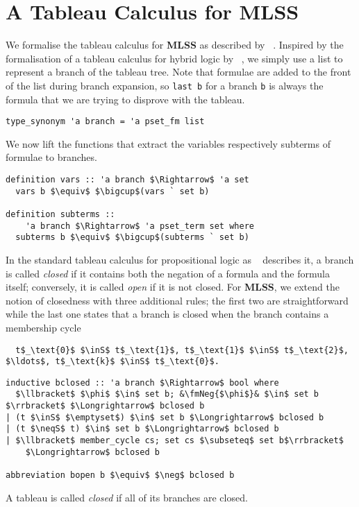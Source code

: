 \documentclass[sigplan,10pt,anonymous,review]{acmart}
\newcommand{\MLSS}{\textbf{MLSS}}
\newcommand{\inS}{\in_\text{s}}
\newcommand{\neqS}{\neq_\text{s}}
\newcommand{\fmNegSymbol}{\boldsymbol{\neg}}
\newcommand{\fmNeg}[1]{$\fmNegSymbol$ #1}
\begin{document}
\section{A Tableau Calculus for MLSS}
We formalise the tableau calculus for \MLSS{} as described by \citeauthor{new_fast_tableau}~\cite{new_fast_tableau}.
Inspired by the formalisation of a tableau calculus for hybrid logic by \citeauthor{hybrid_logic_afp}~\cite{hybrid_logic_afp}, we simply use a list to represent a branch of the tableau tree.
Note that formulae are added to the front of the list during branch expansion, so \lstinline!last b! for a branch \lstinline!b! is always the formula that we are trying to disprove with the tableau. 
\begin{lstlisting}
type_synonym 'a branch = 'a pset_fm list
\end{lstlisting}
We now lift the functions that extract the variables respectively subterms of formulae to branches.
\begin{lstlisting}
definition vars :: 'a branch $\Rightarrow$ 'a set 
  vars b $\equiv$ $\bigcup$(vars ` set b)

definition subterms ::
    'a branch $\Rightarrow$ 'a pset_term set where
  subterms b $\equiv$ $\bigcup$(subterms ` set b)
\end{lstlisting}
In the standard tableau calculus for propositional logic as \citeauthor{tableau}~\cite{tableau} describes it, a branch is called \textit{closed} if it contains both the negation of a formula and the formula itself;
conversely, it is called \textit{open} if it is not closed.
For \MLSS{}, we extend the notion of closedness with three additional rules; the first two are straightforward while the last one states that a branch is closed when the branch contains a membership cycle
\begin{lstlisting}
  t$_\text{0}$ $\inS$ t$_\text{1}$, t$_\text{1}$ $\inS$ t$_\text{2}$, $\ldots$, t$_\text{k}$ $\inS$ t$_\text{0}$.
\end{lstlisting}

\begin{lstlisting}
inductive bclosed :: 'a branch $\Rightarrow$ bool where
  $\llbracket$ $\phi$ $\in$ set b; &\fmNeg{$\phi$}& $\in$ set b $\rrbracket$ $\Longrightarrow$ bclosed b
| (t $\inS$ $\emptyset$) $\in$ set b $\Longrightarrow$ bclosed b
| (t $\neqS$ t) $\in$ set b $\Longrightarrow$ bclosed b
| $\llbracket$ member_cycle cs; set cs $\subseteq$ set b$\rrbracket$
    $\Longrightarrow$ bclosed b

abbreviation bopen b $\equiv$ $\neg$ bclosed b
\end{lstlisting}
A tableau is called \textit{closed} if all of its branches are closed.
\end{document}
